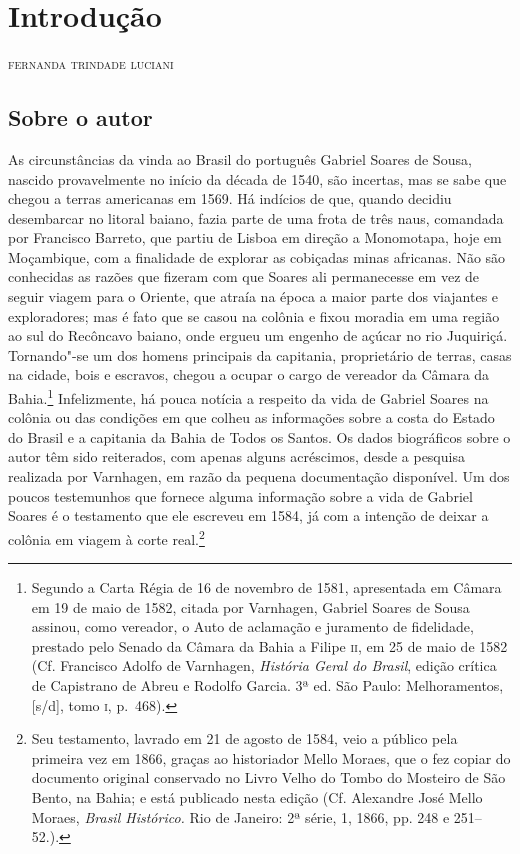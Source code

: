 \chapter[Introdução, \emph{por Fernanda Trindade Luciani}]{Introdução}

\begin{flushright}
\textsc{fernanda trindade luciani}
\end{flushright}

\section{Sobre o autor}

 As circunstâncias da vinda ao Brasil do português Gabriel Soares de
Sousa, nascido provavelmente no início da década de 1540, são incertas,
mas se sabe que chegou a terras americanas em 1569. Há indícios de que,
quando decidiu desembarcar no litoral baiano, fazia parte de uma frota
de três naus, comandada por Francisco Barreto, que partiu de Lisboa em
direção a Monomotapa, hoje em Moçambique, com a finalidade de explorar
as cobiçadas minas africanas. Não são conhecidas as razões que fizeram com que Soares ali
permanecesse em vez de seguir viagem para o Oriente, que atraía na
época a maior parte dos viajantes e exploradores; 
mas é fato que se casou na colônia e fixou moradia em uma região ao sul do
Recôncavo baiano, onde ergueu um engenho de açúcar no rio Juquiriçá.
Tornando"-se um dos homens principais da capitania, proprietário de
terras, casas na cidade, bois e escravos, chegou a ocupar o cargo de
vereador da Câmara da Bahia.\footnote{ Segundo a Carta Régia de 16 de
novembro de 1581, apresentada em Câmara em 19 de maio de 1582, citada
por Varnhagen, Gabriel Soares de Sousa assinou, como vereador, o Auto
de aclamação e juramento de fidelidade, prestado pelo Senado da Câmara
da Bahia a Filipe \textsc{ii}, em 25 de maio de 1582 (Cf. Francisco Adolfo de
Varnhagen, \textit{História Geral do Brasil}, edição crítica de Capistrano de 
Abreu e Rodolfo Garcia. 3ª ed. São Paulo: Melhoramentos, [s/d], tomo \textsc{i}, p.~468).}
Infelizmente, há pouca notícia a respeito da vida de Gabriel Soares na
colônia ou das condições em que colheu as informações sobre a costa do
Estado do Brasil e a capitania da Bahia de Todos os Santos. Os dados
biográficos sobre o autor têm sido reiterados, com apenas alguns
acréscimos, desde a pesquisa realizada por Varnhagen, em razão da
pequena documentação disponível. Um dos poucos testemunhos que fornece
alguma informação sobre a vida de Gabriel Soares é o testamento que ele
escreveu em 1584, já com a intenção de deixar a colônia em viagem à corte
real.\footnote{ Seu testamento, lavrado em 21 de agosto de 1584, veio a
público pela primeira vez em 1866, graças ao historiador Mello Moraes,
que o fez copiar do documento original conservado no Livro Velho do
Tombo do Mosteiro de São Bento, na Bahia; e está publicado nesta edição
(Cf. Alexandre José Mello Moraes, \textit{Brasil Histórico.} Rio de
Janeiro: 2ª série, 1, 1866, pp. 248 e 251--52.).}


